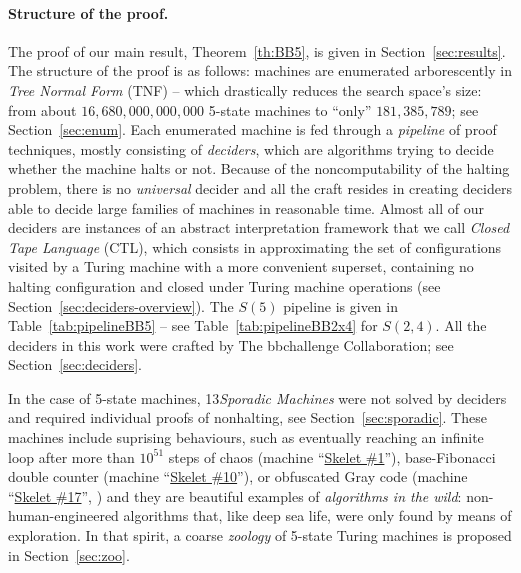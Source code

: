 \documentclass[a4paper,british]{article}
\theoremstyle{definition} %
\numberwithin{equation}{section}
\theoremstyle{definition} %
\newcommand{\BBtheFifthTNF}{181{,}385{,}789}
\newcommand{\numSporadic}{13\xspace}
\begin{document}
\paragraph{Structure of the proof.} The proof of our main result, Theorem~\ref{th:BB5}, is given in Section~\ref{sec:results}. The structure of the proof is as follows: machines are enumerated arborescently in \textit{Tree Normal Form} (TNF) \cite{Brady64} -- which drastically reduces the search space's size: from about $16,680,000,000,000$ 5-state machines to ``only'' $\BBtheFifthTNF$; see Section~\ref{sec:enum}. Each enumerated machine is fed through a \textit{pipeline} of proof techniques, mostly consisting of \textit{deciders}, which are algorithms trying to decide whether the machine halts or not. Because of the noncomputability of the halting problem, there is no \textit{universal} decider and all the craft resides in creating deciders able to decide large families of machines in reasonable time. Almost all of our deciders are instances of an abstract interpretation framework that we call \textit{Closed Tape Language} (CTL), which consists in approximating the set of configurations visited by a Turing machine with a more convenient superset, containing no halting configuration and closed under Turing machine operations (see Section~\ref{sec:deciders-overview}). The $S(5)$ pipeline is given in Table~\ref{tab:pipelineBB5} -- see Table~\ref{tab:pipelineBB2x4} for $S(2,4)$. All the deciders in this work were crafted by The bbchallenge Collaboration; see Section~\ref{sec:deciders}.

In the case of 5-state machines, \numSporadic \textit{Sporadic Machines} were not solved by deciders and required individual proofs of nonhalting, see Section~\ref{sec:sporadic}. These machines include suprising behaviours, such as eventually reaching an infinite loop after more than $10^{51}$ steps of chaos (machine ``\href{https://bbchallenge.org/1RB1RD_1LC0RC_1RA1LD_0RE0LB_---1RC}{Skelet \#1}''), base-Fibonacci double counter (machine ``\href{https://bbchallenge.org/1RB0RA_0LC1RA_1RE1LD_1LC0LD_---0RB}{Skelet \#10}''), or obfuscated Gray code (machine ``\href{https://bbchallenge.org/1RB---_0LC1RE_0LD1LC_1RA1LB_0RB0RA}{Skelet \#17}'', \cite{xu2024skelet17fifthbusy}) and they are beautiful examples of \textit{algorithms in the wild}: non-human-engineered algorithms that, like deep sea life, were only found by means of exploration. In that spirit, a coarse \textit{zoology} of 5-state Turing machines is proposed in Section~\ref{sec:zoo}.
\end{document}
